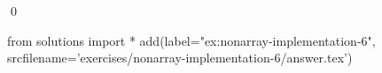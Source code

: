 
\begin{ex} 
  \label{ex:nonarray-implementation-6}
  
  \qed
\end{ex} 
\begin{python0}
from solutions import *
add(label="ex:nonarray-implementation-6",
    srcfilename='exercises/nonarray-implementation-6/answer.tex') 
\end{python0}
